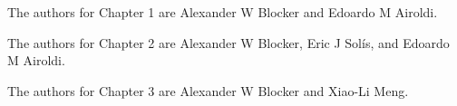 \indent

The authors for Chapter 1 are Alexander W Blocker and Edoardo M Airoldi.

The authors for Chapter 2 are Alexander W Blocker, Eric J Sol\'is, and Edoardo M Airoldi.

The authors for Chapter 3 are Alexander W Blocker and Xiao-Li Meng.
